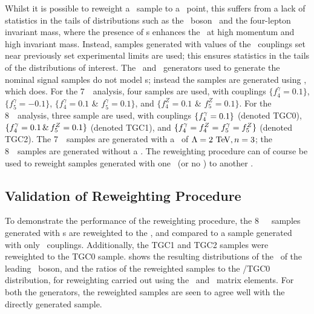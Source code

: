 Whilst it is possible to reweight a \sm\ sample to a \TGC\ point, this suffers
from a lack of statistics in the tails of distributions such as the \Z\ boson \pt\ 
and the four-lepton invariant mass, where the presence of \TGC s
enhances the \cx\ at high momentum and high invariant mass. Instead,
samples generated with values of the \TGC\ couplings set near previously set
experimental limits are used; this ensures statistics in the tails of the
distributions of interest. The \powhegbox\ and \ggZZ\ generators used to generate the nominal signal
samples do not model \TGC s; instead the samples are generated using \sherpa,
which does. For the 7~\tev\ analysis, four samples are used, with couplings
 $\{f_{4}^{\gamma}=0.1\}$, $\{f_{5}^{\gamma}=-0.1\}$,
$\{f_{4}^{\gamma}=0.1$ \& $f_{5}^{\gamma}=0.1\}$, and 
$\{f_{4}^{Z}=0.1$ \& $f_5^{Z}=0.1\}$. For the 8~\tev\ analysis, three sample are
used, with couplings $\{f_{4}^{\gamma}=0.1\}$ (denoted TGC0),
$\{f_{4}^{\gamma}=0.1 \,\&\, f_{5}^{Z}=0.1\}$ (denoted TGC1), and 
$\{ f_{4}^{\gamma} = f_{4}^{Z} = f_{5}^{\gamma} = f_{5}^{Z} \}$ (denoted TGC2). The 7~\tev\ samples are
generated with a \formfactor\ of $\Lambda=2\tev,n=3$; the 8~\tev\ samples are
generated without a \formfactor. The reweighting procedure can of course be used to
reweight samples generated with one \formfactor\ (or no \formfactor) to another
\formfactor.

\subsection{Validation of Reweighting Procedure}

To demonstrate the performance of the reweighting procedure, the 8~\tev\ \sherpa\
samples generated with \TGC s are reweighted to the \sm, and
compared to a sample generated with only \sm\ couplings. Additionally, the TGC1 and TGC2
samples were reweighted to the TGC0 sample.  shows the
resulting distributions of the \pt\ of the leading \Z\ boson, and the ratios of
the reweighted samples to the \sm/TGC0 distribution, for reweighting carried out
using the \BHO\ and \BR\ matrix elements. For both the generators, the reweighted samples are seen
to agree well with the directly generated sample.

